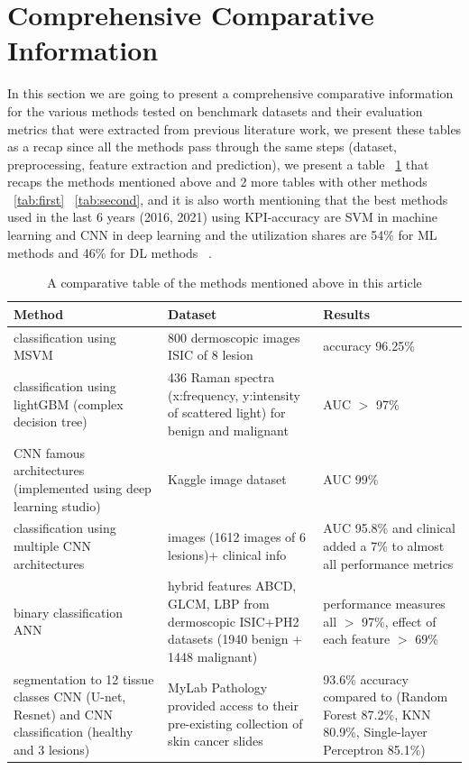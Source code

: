 \section{Comprehensive Comparative Information}
In this section we are going to present a comprehensive comparative information for the various methods tested on benchmark datasets and their evaluation metrics that were extracted from previous literature work, we present these tables as a recap since all the methods pass through the same steps (dataset, preprocessing, feature extraction and prediction), we present a table ~\ref{tab:outable} that recaps the methods  mentioned above and 2 more tables with other methods ~\ref{tab:first} ~\ref{tab:second}, and it is also worth mentioning that the best methods used in the last 6 years (2016, 2021) using KPI-accuracy are SVM in machine learning and CNN in deep learning and the utilization shares are 54\% for ML methods and 46\% for DL methods ~\cite{Painuli2022}.


\begin{table}[htbp]
    \begin{center}
        \begin{tabular}{p{3cm}|p{3cm}|p{6cm}}
        \hline 
        Method & Dataset & Results  \\ 
        \hline 
        classification using MSVM & 800 dermoscopic images ISIC of 8 lesion &  accuracy 96.25\% \\ 
        \hline 
        classification using lightGBM (complex decision tree) & 436 Raman spectra (x:frequency, y:intensity of scattered light) for benign and malignant & AUC $>$ 97\%  \\ 
        \hline 
        CNN famous architectures (implemented using deep learning studio) & Kaggle image dataset &   AUC 99\% \\ 
        \hline 
        classification using multiple CNN architectures & images (1612 images of 6 lesions)+ clinical info &  AUC 95.8\% and clinical added a 7\% to almost all performance metrics \\ 
        \hline 
        binary classification ANN & hybrid features ABCD, GLCM, LBP from dermoscopic  ISIC+PH2 datasets (1940 benign + 1448 malignant) & performance measures all $>$ 97\%, effect of each feature $>$ 69\%  \\ 
        \hline 
        segmentation to 12 tissue classes CNN (U-net, Resnet) and CNN classification (healthy and 3 lesions) & MyLab Pathology provided access to their pre-existing collection of skin cancer slides & 93.6\% accuracy compared to (Random Forest 87.2\%, KNN 80.9\%, Single-layer Perceptron 85.1\%) \\ 
        \hline 
        \end{tabular} 
    \end{center}
\caption{A comparative table of the methods mentioned above in this article}
\label{tab:outable}
\end{table}

